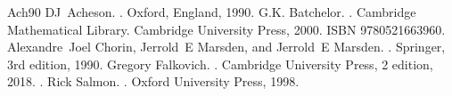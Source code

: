 \documentclass[letterpaper,10pt,english]{jupyterBook}
\begin{document}
\begin{sphinxthebibliography}{Ach90}
\sphinxAtStartPar
DJ Acheson. . Oxford, England, 1990.
\sphinxAtStartPar
G.K. Batchelor. . Cambridge Mathematical Library. Cambridge University Press, 2000. ISBN 9780521663960.
\sphinxAtStartPar
Alexandre Joel Chorin, Jerrold E Marsden, and Jerrold E Marsden. . Springer, 3rd edition, 1990.
\sphinxAtStartPar
Gregory Falkovich. . Cambridge University Press, 2 edition, 2018. .
\sphinxAtStartPar
Rick Salmon. . Oxford University Press, 1998.
\end{sphinxthebibliography}







\renewcommand{\indexname}{Index}
\printindex
\end{document}
